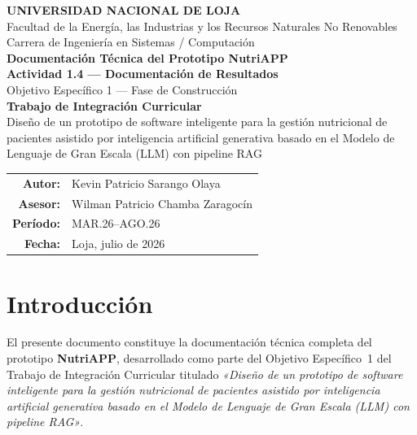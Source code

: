 \documentclass[12pt,a4paper]{article}
\begin{document}
\begin{titlepage}
  \centering
  {\Large\bfseries UNIVERSIDAD NACIONAL DE LOJA}\\[0.3cm]
  {\large Facultad de la Energía, las Industrias y los Recursos Naturales No Renovables}\\[0.1cm]
  {\large Carrera de Ingeniería en Sistemas / Computación}\\[2.5cm]

  {\LARGE\bfseries Documentación Técnica del Prototipo NutriAPP}\\[0.4cm]
  {\Large\bfseries Actividad 1.4 — Documentación de Resultados}\\[0.4cm]
  {\large Objetivo Específico 1 — Fase de Construcción}\\[2cm]

  {\large\bfseries Trabajo de Integración Curricular}\\[0.3cm]
  {\normalsize Diseño de un prototipo de software inteligente para la gestión nutricional
  de pacientes asistido por inteligencia artificial generativa basado en
  el Modelo de Lenguaje de Gran Escala (LLM) con pipeline RAG}\\[2cm]

  \begin{tabular}{rl}
    \textbf{Autor:}   & Kevin Patricio Sarango Olaya \\[0.2cm]
    \textbf{Asesor:}  & Wilman Patricio Chamba Zaragocín \\[0.2cm]
    \textbf{Período:} & MAR.26--AGO.26 \\[0.2cm]
    \textbf{Fecha:}   & Loja, julio de 2026 \\
  \end{tabular}
\end{titlepage}

\tableofcontents
\clearpage

\section{Introducción}

El presente documento constituye la documentación técnica completa del prototipo
\textbf{NutriAPP}, desarrollado como parte del Objetivo Específico~1 del Trabajo
de Integración Curricular titulado \emph{«Diseño de un prototipo de software
inteligente para la gestión nutricional de pacientes asistido por inteligencia
artificial generativa basado en el Modelo de Lenguaje de Gran Escala (LLM) con
pipeline RAG»}.
\end{document}
